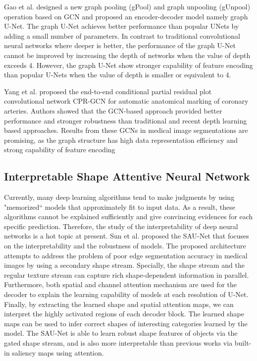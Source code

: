 Gao et al. designed a new graph pooling (gPool) and graph unpooling (gUnpool)
operation based on GCN and proposed an encoder-decoder model namely graph U-Net.
The graph U-Net achieves better performance than popular UNets by adding a small
number of parameters. In contrast to traditional convolutional neural networks
where deeper is better, the performance of the graph U-Net cannot be improved by
increasing the depth of networks when the value of depth exceeds 4. However, the
graph U-Net show stronger capability of feature encoding than popular U-Nets
when the value of depth is smaller or equivalent to 4.

Yang et al. proposed the end-to-end conditional partial residual plot
convolutional network CPR-GCN for automatic anatomical marking of coronary
arteries. Authors showed that the GCN-based approach provided better performance
and stronger robustness than traditional and recent depth learning based
approaches. Results from these GCNs in medical image segmentations are
promising, as the graph structure has high data representation efficiency and
strong capability of feature encoding

\subsection{Interpretable Shape Attentive Neural Network}
Currently, many deep learning algorithms tend to make judgments by using
"memorized`` models that approximately fit to input data. As a result, these
algorithms cannot be explained sufficiently and give convincing evidences for
each specific prediction. Therefore, the study of the interpretability of deep
neural networks is a hot topic at present. Sun et al. proposed the SAU-Net that
focuses on the interpretability and the robustness of models. The proposed
architecture attempts to address the problem of poor edge segmentation accuracy
in medical images by using a secondary shape stream. Specially, the shape stream
and the regular texture stream can capture rich shape-dependent information in
parallel. Furthermore, both spatial and channel attention mechanism are used for
the decoder to explain the learning capability of models at each resolution of
U-Net. Finally, by extracting the learned shape and spatial attention maps, we
can interpret the highly activated regions of each decoder block. The learned
shape maps can be used to infer correct shapes of interesting categories learned
by the model. The SAU-Net is able to learn robust shape features of objects via
the gated shape stream, and is also more interpretable than previous works via
built-in saliency maps using attention.

